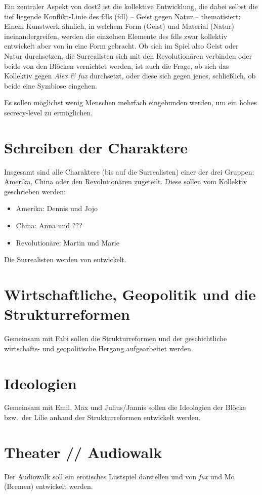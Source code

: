 Ein zentraler Aspekt von \ac{dost2} ist die kollektive Entwicklung, die dabei
selbst die tief liegende Konflikt-Linie des \aclp{fdl} (\acs{fdl}) 
-- Geist gegen Natur -- thematisiert: Einem Kunstwerk ähnlich, in welchem Form
(Geist) und Material (Natur) ineinandergreifen, werden die einzelnen Elemente
des \ac{fdl}s zwar kollektiv entwickelt aber von \creators{} in eine Form
gebracht. Ob sich im Spiel also Geist oder Natur durchsetzen, die Surrealisten
sich mit den Revolutionären verbinden oder beide von den Blöcken vernichtet
werden, ist auch die Frage, ob sich das Kollektiv gegen \emph{Alex \& fux}
durchsetzt, oder diese sich gegen jenes, schließlich, ob beide eine Symbiose
eingehen. 

Es sollen möglichst wenig Menschen mehrfach eingebunden werden, um ein hohes
secrecy-level zu ermöglichen.

\section{Schreiben der Charaktere}
Insgesamt sind alle Charaktere (bis auf die Surrealisten) einer der drei
Gruppen: Amerika, China oder den Revolutionären zugeteilt. Diese sollen vom
Kollektiv geschrieben werden: 
\begin{itemize} 
  \item Amerika: Dennis und Jojo 
  \item China: Anna und ???
  \item Revolutionäre: Martin und Marie 
\end{itemize}
Die Surrealisten werden von \creators{} entwickelt.

\section{Wirtschaftliche, Geopolitik und die Strukturreformen} 
Gemeinsam mit Fabi sollen die Strukturreformen und der geschichtliche
wirtschafts- und geopolitische Hergang aufgearbeitet werden. 

\section{Ideologien} 
Gemeinsam mit Emil, Max und Julius/Jannis sollen die Ideologien der Blöcke
bzw.~der Lilie anhand der Strukturreformen entwickelt werden. 

\section{Theater // Audiowalk}
Der Audiowalk soll ein erotisches Lustspiel darstellen und von \emph{fux} und
Mo (Bremen) entwickelt werden. 

